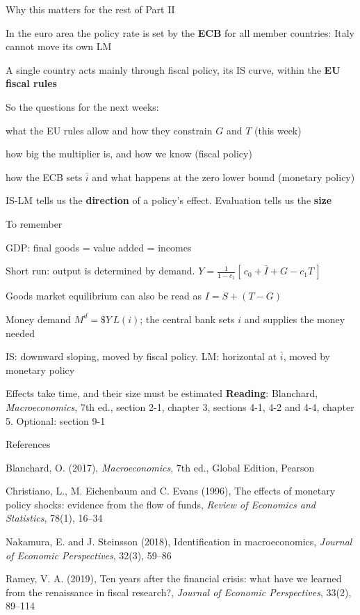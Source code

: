 \documentclass[aspectratio=169,xcolor=table]{beamer}
\begin{document}
\begin{frame}{Why this matters for the rest of Part II}
\small
\bi
  \item In the euro area the policy rate is set by the \textbf{ECB} for all member countries: Italy cannot move its own LM
  \item A single country acts mainly through fiscal policy, its IS curve, within the \textbf{EU fiscal rules}
  \item So the questions for the next weeks:
  \bi
    \item what the EU rules allow and how they constrain $G$ and $T$ (this week)
    \item how big the multiplier is, and how we know (fiscal policy)
    \item how the ECB sets $\bar i$ and what happens at the zero lower bound (monetary policy)
  \ei
\ei
\vspace{0.1cm}
\begin{block}{}
\centering IS-LM tells us the \textbf{direction} of a policy's effect. Evaluation tells us the \textbf{size}
\end{block}
\end{frame}

\begin{frame}{To remember}
\small
\bi
  \item GDP: final goods = value added = incomes
  \item Short run: output is determined by demand. $Y = \frac{1}{1-c_1}[\,c_0 + \bar I + G - c_1 T\,]$
  \item Goods market equilibrium can also be read as $I = S + (T - G)$
  \item Money demand $M^d = \$Y\,L(i)$; the central bank sets $i$ and supplies the money needed
  \item IS: downward sloping, moved by fiscal policy. LM: horizontal at $\bar i$, moved by monetary policy
  \item Effects take time, and their size must be estimated
\ei
\vspace{0.1cm}
\textbf{Reading}: Blanchard, \textit{Macroeconomics}, 7th ed., section 2-1, chapter 3, sections 4-1, 4-2 and 4-4, chapter 5. Optional: section 9-1
\end{frame}

\begin{frame}{References}
\tiny
\bi
  \item Blanchard, O. (2017), \textit{Macroeconomics}, 7th ed., Global Edition, Pearson
  \item Christiano, L., M. Eichenbaum and C. Evans (1996), The effects of monetary policy shocks: evidence from the flow of funds, \textit{Review of Economics and Statistics}, 78(1), 16--34
  \item Nakamura, E. and J. Steinsson (2018), Identification in macroeconomics, \textit{Journal of Economic Perspectives}, 32(3), 59--86
  \item Ramey, V. A. (2019), Ten years after the financial crisis: what have we learned from the renaissance in fiscal research?, \textit{Journal of Economic Perspectives}, 33(2), 89--114
\ei
\end{frame}

\pelQuestions
\end{document}
